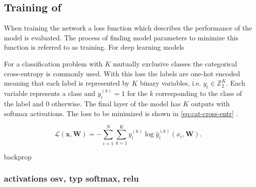 \subsection{Training of }
When training the network a loss function which describes the performance of the model is evaluated. The process of finding model parameters to minimize this function is referred to as training. For deep learning models

For a classification problem with $K$ mutually exclusive classes the categorical cross-entropy is commonly used. With this loss the labels are one-hot encoded meaning that each label is represented by $K$ binary variables, i.e. $y_i \in \mathbb{Z}_2^K$. Each variable represents a class and $y_i^{(k)} = 1$ for the $k$ corresponding to the class of the label and 0 otherwise. The final layer of the model has $K$ outputs with softmax activations. The loss to be minimized is shown in \eqref{eq:cat-cross-entr} \cite{Bishop2006}.

\begin{equation}
    \mathcal{L}(\pmb{x}, \pmb{W}) = - \sum_{i=1}^N \sum_{k=1}^K y_i^{(k)} \log \hat{y}_i^{(k)}(x_i, \pmb{W}).
    \label{eq:cat-cross-entr}
\end{equation}

backprop



\subsubsection{activations osv, typ softmax, relu}




